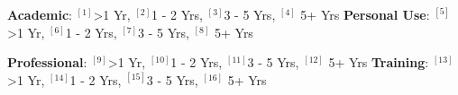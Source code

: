 \begin{cventries}
  \cventry
    {} %
    {} 
    {} 
    {} 
    {
      \begin{cvitems} %
        \item[]{\textbf{Academic}: \label{1}{$^{[1]}$>1 Yr}, \label{2}{$^{[2]}$1 - 2 Yrs}, \label{3}{$^{[3]}$3 - 5 Yrs}, \label{4}{$^{[4]}$ 5+ Yrs}%
		\hspace{1.48cm}
		\textbf{Personal Use}: \label{5}{$^{[5]}$>1 Yr}, \label{6}{$^{[6]}$1 - 2 Yrs}, \label{7}{$^{[7]}$3 - 5 Yrs}, \label{8}{$^{[8]}$ 5+ Yrs}}
		\item[]{\textbf{Professional}: \label{9}{$^{[9]}$>1 Yr}, \label{10}{$^{[10]}$1 - 2 Yrs}, \label{11}{$^{[11]}$3 - 5 Yrs}, \label{12}{$^{[12]}$ 5+ Yrs}%
		\hspace{0.5cm}
		\textbf{Training}: \label{13}{$^{[13]}$>1 Yr}, \label{14}{$^{[14]}$1 - 2 Yrs}, \label{15}{$^{[15]}$3 - 5 Yrs}, \label{16}{$^{[16]}$ 5+ Yrs}}
      \end{cvitems}
    }  
  \vspace{0.4cm} 
      

\end{cventries}